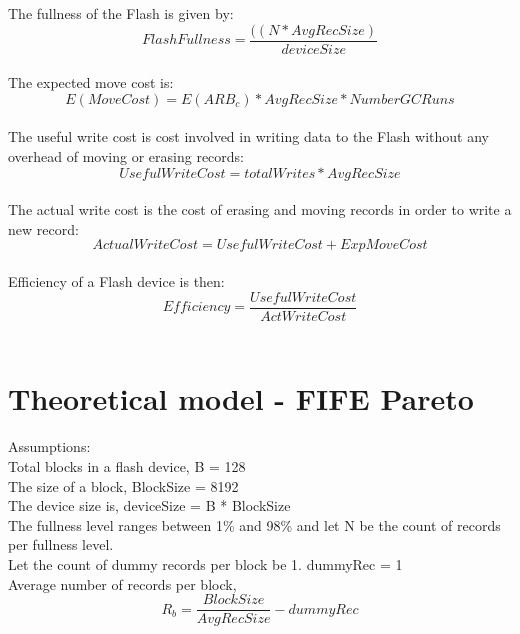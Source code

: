 \documentclass[11pt]{article} %
\begin{document}
The fullness of the Flash is given by:
\begin{equation}FlashFullness = \frac{((N * AvgRecSize)}{deviceSize}\end{equation}\\

The expected move cost is:
\begin{equation}E(MoveCost) = E(ARB_c) * AvgRecSize * NumberGCRuns\end{equation}\\

The useful write cost is cost involved in writing data to the Flash without any overhead of moving or erasing records: \begin{equation}UsefulWriteCost = totalWrites * AvgRecSize\end{equation}\\

The actual write cost is the cost of erasing and moving records in order to write a new record:
\begin{equation}ActualWriteCost = UsefulWriteCost + ExpMoveCost\end{equation}\\

Efficiency of a Flash device is then:
\begin{equation}Efficiency = \frac{UsefulWriteCost}{ActWriteCost}\end{equation}\\


\section{Theoretical model - FIFE Pareto}
Assumptions:\\
Total blocks in a flash device, B = 128\\
The size of a block, BlockSize = 8192\\
The device size is, deviceSize = B * BlockSize\\
The fullness level ranges between 1\% and 98\% and let N be the count of records per fullness level.\\
Let the count of dummy records per block be 1. dummyRec = 1\\
Average number of records per block, 
\begin{equation}R_b = \frac{BlockSize}{AvgRecSize} - dummyRec\end{equation}\\
\end{document}
